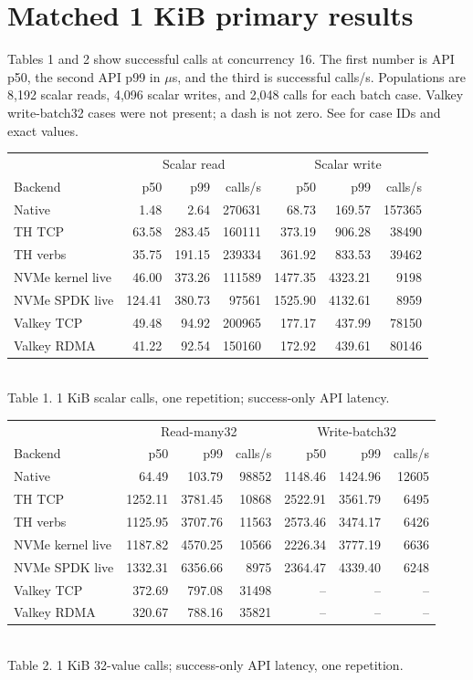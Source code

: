 \documentclass[10pt,a4paper]{article}
\newcommand{\us}{$\mu$s}
\begin{document}
\section{Matched 1 KiB primary results}
Tables 1 and 2 show successful calls at concurrency 16. The first number is API p50, the second API p99 in \us, and the third is successful calls/s. Populations are 8,192 scalar reads, 4,096 scalar writes, and 2,048 calls for each batch case. Valkey write-batch32 cases were not present; a dash is not zero. See  for case IDs and exact values.
\begin{center}\small
\begin{tabular}{lrrr|rrr}\toprule
& \multicolumn{3}{c|}{Scalar read} & \multicolumn{3}{c}{Scalar write}\\
Backend & p50 & p99 & calls/s & p50 & p99 & calls/s\\\midrule
Native & 1.48 & 2.64 & 270631 & 68.73 & 169.57 & 157365\\
TH TCP & 63.58 & 283.45 & 160111 & 373.19 & 906.28 & 38490\\
TH verbs & 35.75 & 191.15 & 239334 & 361.92 & 833.53 & 39462\\
NVMe kernel live & 46.00 & 373.26 & 111589 & 1477.35 & 4323.21 & 9198\\
NVMe SPDK live & 124.41 & 380.73 & 97561 & 1525.90 & 4132.61 & 8959\\
Valkey TCP & 49.48 & 94.92 & 200965 & 177.17 & 437.99 & 78150\\
Valkey RDMA & 41.22 & 92.54 & 150160 & 172.92 & 439.61 & 80146\\\bottomrule
\end{tabular}\\[2pt] Table 1. 1 KiB scalar calls, one repetition; success-only API latency.
\end{center}
\begin{center}\small
\begin{tabular}{lrrr|rrr}\toprule
& \multicolumn{3}{c|}{Read-many32} & \multicolumn{3}{c}{Write-batch32}\\
Backend & p50 & p99 & calls/s & p50 & p99 & calls/s\\\midrule
Native & 64.49 & 103.79 & 98852 & 1148.46 & 1424.96 & 12605\\
TH TCP & 1252.11 & 3781.45 & 10868 & 2522.91 & 3561.79 & 6495\\
TH verbs & 1125.95 & 3707.76 & 11563 & 2573.46 & 3474.17 & 6426\\
NVMe kernel live & 1187.82 & 4570.25 & 10566 & 2226.34 & 3777.19 & 6636\\
NVMe SPDK live & 1332.31 & 6356.66 & 8975 & 2364.47 & 4339.40 & 6248\\
Valkey TCP & 372.69 & 797.08 & 31498 & -- & -- & --\\
Valkey RDMA & 320.67 & 788.16 & 35821 & -- & -- & --\\\bottomrule
\end{tabular}\\[2pt] Table 2. 1 KiB 32-value calls; success-only API latency, one repetition.
\end{center}
\end{document}
